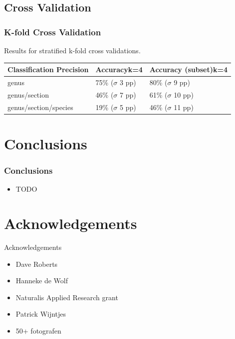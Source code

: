 \documentclass[]{beamer}
\begin{document}
    \subsection{Cross Validation}

    \begin{frame}
        \frametitle{K-fold Cross Validation}

        Results for stratified k-fold cross validations.

        \begin{table}[h]\scriptsize
            \begin{center}
            \begin{tabular}{lp{3cm}p{3cm}}
            \toprule
            \textbf{Classification Precision} & \textbf{Accuracy{\newline}k=4} & \textbf{Accuracy (subset){\newline}k=4} \\
            \midrule
            genus                   & 75\% ({$\sigma$} 3 pp)    & 80\% ({$\sigma$} 9 pp) \\
            genus/section           & 46\% ({$\sigma$} 7 pp)    & 61\% ({$\sigma$} 10 pp) \\
            genus/section/species   & 19\% ({$\sigma$} 5 pp)    & 46\% ({$\sigma$} 11 pp) \\
            \bottomrule
            \end{tabular}
            \end{center}
        \end{table}
    \end{frame}


\section{Conclusions}

    \begin{frame}
        \frametitle{Conclusions}

        \begin{itemize}
            \item {TODO}
        \end{itemize}
    \end{frame}


\section*{Acknowledgements}

    \begin{frame}{Acknowledgements}

        \begin{itemize}
            \item Dave Roberts
            \item Hanneke de Wolf
            \item Naturalis Applied Research grant
            \item Patrick Wijntjes
            \item 50+ fotografen
        \end{itemize}
    \end{frame}
\end{document}
